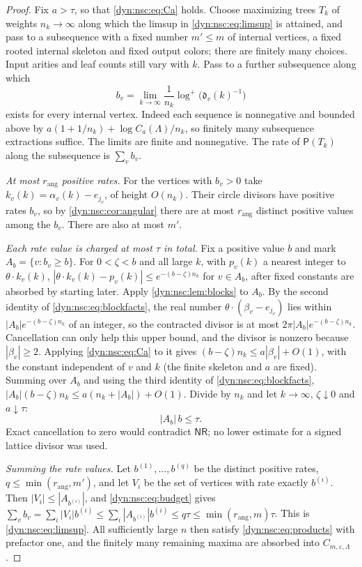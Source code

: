 \documentclass[11pt,letterpaper]{article}
\theoremstyle{definition}
\theoremstyle{remark}
\newcommand{\eps}{\varepsilon}
\newcommand{\nres}{\mathsf{NR}}
\newcommand{\rang}{r_{\mathrm{ang}}}
\numberwithin{equation}{section}
\begin{document}
\begin{proof}
Fix $a>\tau$, so that \eqref{dyn:nsc:eq:Ca} holds. Choose maximizing trees
$T_k$ of weights $n_k\to\infty$ along which the limsup in
\eqref{dyn:nsc:eq:limsup} is attained, and pass to a subsequence with a fixed
number $m'\le m$ of internal vertices, a fixed rooted internal skeleton and
fixed output colors; there are finitely many choices. Input arities and leaf
counts still vary with $k$. Pass to a further subsequence along which
\[
 b_v=\lim_{k\to\infty}\frac1{n_k}\log^{+}\bigl(\mathfrak d_v(k)^{-1}\bigr)
\]
exists for every internal vertex. Indeed each sequence is nonnegative
and bounded above by $a(1+1/n_k)+\log C_a(\Lambda)/n_k$, so finitely
many subsequence extractions suffice. The limits are finite and nonnegative. The rate of
$\mathsf P(T_k)$ along the subsequence is $\sum_vb_v$.

\emph{At most $\rang$ positive rates.} For the vertices with $b_v>0$ take
$k_v(k)=\alpha_v(k)-e_{j_v}$, of height $O(n_k)$. Their circle divisors have
positive rates $b_v$, so by \cref{dyn:nsc:cor:angular} there are at most
$\rang$ distinct positive values among the $b_v$. There are also at most
$m'$.

\emph{Each rate value is charged at most $\tau$ in total.} Fix a positive
value $b$ and mark $A_b=\{v:b_v\ge b\}$. For $0<\zeta<b$ and all large $k$,
with $p_v(k)$ a nearest integer to $\theta\cdot k_v(k)$,
$|\theta\cdot k_v(k)-p_v(k)|\le e^{-(b-\zeta)n_k}$ for $v\in A_b$, after
fixed constants are absorbed by starting later. Apply
\cref{dyn:nsc:lem:blocks} to $A_b$. By the second identity of
\eqref{dyn:nsc:eq:blockfacts}, the real number
$\theta\cdot(\beta_v-e_{j_v})$ lies within $|A_b|e^{-(b-\zeta)n_k}$ of an
integer, so the contracted divisor is at most
$2\pi|A_b|e^{-(b-\zeta)n_k}$. Cancellation can only help this upper
bound, and the divisor is nonzero because $|\beta_v|\ge2$. Applying
\eqref{dyn:nsc:eq:Ca} to it gives $(b-\zeta)n_k\le a|\beta_v|+O(1)$, with
the constant independent of $v$ and $k$ (the finite skeleton and $a$ are
fixed). Summing over $A_b$ and using the
third identity of \eqref{dyn:nsc:eq:blockfacts},
$|A_b|(b-\zeta)n_k\le a(n_k+|A_b|)+O(1)$. Divide by $n_k$ and let
$k\to\infty$, $\zeta\downarrow0$ and $a\downarrow\tau$:
\begin{equation}\label{dyn:nsc:eq:budget}
 |A_b|\,b\le\tau .
\end{equation}
Exact cancellation to zero would contradict $\nres$; no lower estimate for a
signed lattice divisor was used.

\emph{Summing the rate values.} Let $b^{(1)},\dots,b^{(q)}$ be the distinct
positive rates, $q\le\min(\rang,m')$, and let $V_i$ be the set of vertices
with rate exactly $b^{(i)}$. Then $|V_i|\le|A_{b^{(i)}}|$, and
\eqref{dyn:nsc:eq:budget} gives
$\sum_vb_v=\sum_i|V_i|b^{(i)}\le\sum_i|A_{b^{(i)}}|b^{(i)}\le q\tau\le\min(\rang,m)\tau$.
This is \eqref{dyn:nsc:eq:limsup}. All sufficiently large $n$ then satisfy
\eqref{dyn:nsc:eq:products} with prefactor one, and the finitely many
remaining maxima are absorbed into $C_{m,\eps,\Lambda}$.
\end{proof}
\end{document}

